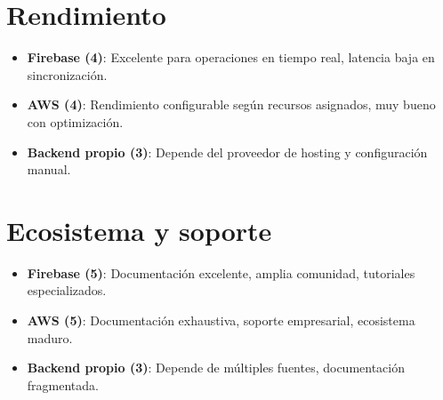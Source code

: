 \section{Rendimiento}

\begin{itemize}
    \item \textbf{Firebase (4)}: Excelente para operaciones en tiempo real, latencia baja en sincronización.
    
    \item \textbf{AWS (4)}: Rendimiento configurable según recursos asignados, muy bueno con optimización.
    
    \item \textbf{Backend propio (3)}: Depende del proveedor de hosting y configuración manual.
\end{itemize}

\section{Ecosistema y soporte}

\begin{itemize}
    \item \textbf{Firebase (5)}: Documentación excelente, amplia comunidad, tutoriales especializados.
    
    \item \textbf{AWS (5)}: Documentación exhaustiva, soporte empresarial, ecosistema maduro.
    
    \item \textbf{Backend propio (3)}: Depende de múltiples fuentes, documentación fragmentada.
\end{itemize}